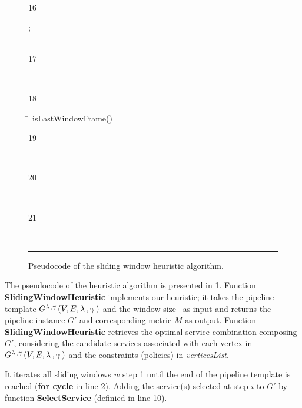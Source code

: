 \begin{figure}[!t]
\begin{tabbing}
                    \begin{redtext}16\end{redtext};\\
                    \\
                    \begin{redtext}17\end{redtext}\\
                    \begin{redtext}18\end{redtext}\=~isLastWindowFrame()\\
                    \begin{redtext}19\end{redtext}\tabone{} \bestcombination\\
                    \begin{redtext}20\end{redtext}\\
                    \begin{redtext}21\end{redtext}\tabone{} \bestcombination[0]\\



                \end{tabbing}
        \hrule
        \vspace{10pt}
        \caption{\label{fig:slidingwindow-pseudocode} Pseudocode of the sliding window heuristic algorithm.}
\end{figure}

The pseudocode of the heuristic algorithm is presented in \cref{fig:slidingwindow-pseudocode}.
Function \textbf{SlidingWindowHeuristic} implements our heuristic; it takes the pipeline template $G^{\lambda\,,\gamma\,}(V,E,\lambda\,,\gamma\,)$ and the window size \windowsize\ as input and returns the pipeline instance $G'$ and corresponding metric $M$ as output. Function \textbf{SlidingWindowHeuristic} retrieves the optimal service combination composing $G'$, considering the candidate services associated with each vertex in $G^{\lambda\,,\gamma\,}(V,E,\lambda\,,\gamma\,)$ and the constraints (policies) in \emph{verticesList}.

It iterates all sliding windows $w$ step 1 until the end of the pipeline template is reached (\textbf{for cycle} in line 2). Adding the service(s) selected at step $i$ to $G'$ by function \textbf{SelectService} (definied in line 10).


